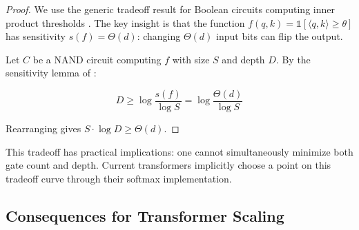 \begin{proof}






We use the generic tradeoff result for Boolean circuits computing inner product thresholds \cite{paterson1977deterministic}. The key insight is that the function $f(q,k) = \mathbb{1}[\langle q, k \rangle \geq \theta]$ has sensitivity $s(f) = \Theta(d)$: changing $\Theta(d)$ input bits can flip the output.













Let $C$ be a NAND circuit computing $f$ with size $S$ and depth $D$. By the sensitivity lemma of \cite{boppana1997complexity}:






\[






D \geq \log \frac{s(f)}{\log S} = \log \frac{\Theta(d)}{\log S}






\]






Rearranging gives $S \cdot \log D \geq \Theta(d)$.






\end{proof}













This tradeoff has practical implications: one cannot simultaneously minimize both gate count and depth. Current transformers implicitly choose a point on this tradeoff curve through their softmax implementation.













\subsection{Consequences for Transformer Scaling}













